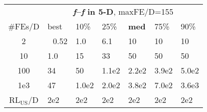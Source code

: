 \begin{tabular}{c|llllll}
 & \multicolumn{6}{|c}{\textbf{\textit{f}\raisebox{-0.35ex}{1}--\textit{f}\raisebox{-0.35ex}{24} in 5-D}, maxFE/D=155}\\
\#FEs/D & best & 10\% & 25\% & \textbf{med} & 75\% & 90\%\\
2 & ~\,0.52 & \hspace*{1ex}1.0 & \hspace*{1ex}6.1 & 10 & 10 & 10\\
10 & \hspace*{1ex}1.0 & 15 & 33 & 50 & 50 & 50\\
100 & 34 & 50 & 1.1e2 & 2.2e2 & 3.9e2 & 5.0e2\\
1e3 & 47 & 1.0e2 & 2.0e2 & 3.8e2 & 7.0e2 & 3.6e3\\
$\text{RL}_{\text{US}}$/D & 2e2 & 2e2 & 2e2 & 2e2 & 2e2 & 2e2
\end{tabular}
